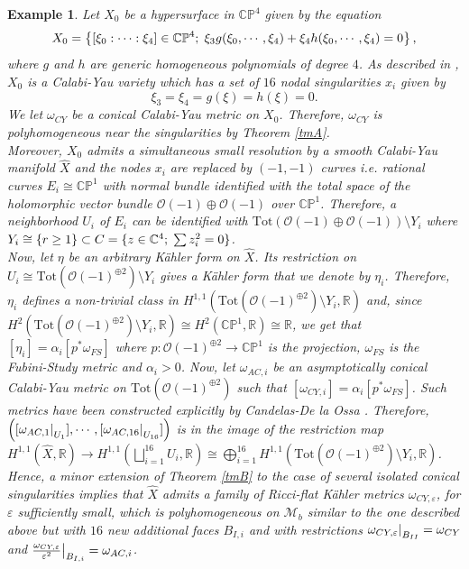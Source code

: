 \documentclass[a4paper,11pt]{article}
\newcounter{mythm}[section]
\newtheorem{ex}[mythm]{Example}
\def\C{\mathbb{C}}
\def\R{\mathbb{R}}
\newcommand\restr[2]{{%
  \left.\kern-\nulldelimiterspace %
  #1 %
  \littletaller %
  \right|_{#2} %
  }}
\newcommand{\littletaller}{\mathchoice{\vphantom{\big|}}{}{}{}}
\begin{document}
\begin{ex}
    Let $X_0$ be a hypersurface in $\mathbb{CP}^4$ given by the equation 
    $$
    X_0 = \left\{[\xi_0 : \cdots : \xi_4] \in \mathbb{CP}^4; \hspace{0.1cm} \xi_3 g(\xi_0, \cdots, \xi_4) + \xi_4h(\xi_0, \cdots, \xi_4) =0 \right\},
    $$
    where $g$ and $h$ are generic homogeneous polynomials of degree $4$. As described in \cite[Section 1, Section 2]{Rossi}, $X_0$ is a Calabi-Yau variety which has a set of $16$ nodal singularities $x_i$ given by 
    $$
    \xi_3 =\xi_4= g(\xi)=h(\xi)=0.
    $$
    We let $\omega_{CY}$ be a conical Calabi-Yau metric on $X_0$. Therefore, $\omega_{CY}$ is polyhomogeneous near the singularities by Theorem \ref{tmA}.\\
    
    Moreover, $X_0$ admits a simultaneous small resolution by a smooth Calabi-Yau manifold $\hat X$ and the nodes $x_i$  are replaced by $(-1,-1)$ curves i.e. rational curves $E_i \cong \mathbb{CP}^1$ with normal bundle identified with the total space of the holomorphic vector bundle $\mathcal{O}(-1) \oplus \mathcal{O}(-1)$ over $\mathbb{CP}^1$. Therefore, a neighborhood $U_i$ of $E_i$ can be identified with $\mathrm{Tot}(\mathcal{O}(-1) \oplus \mathcal{O}(-1)) \setminus Y_i$ where $Y_i \cong \{r \geq 1  \} \subset C = \{z \in \C^4; \hspace{0.1cm} \sum z_i^2=0 \}$.\\
    
    Now, let $\eta$ be an arbitrary Kähler form on $\hat X$. Its restriction on $U_i \cong \mathrm{Tot}(\mathcal{O}(-1)^{\oplus 2}) \setminus Y_i$ gives a  Kähler form that we denote by $\eta_i$.
    Therefore, $\eta_i$ defines a non-trivial class in $H^{1,1}\left(\mathrm{Tot}(\mathcal{O}(-1)^{\oplus 2}) \setminus Y_i, \R \right)$ and, since $H^2\left(\mathrm{Tot}(\mathcal{O}(-1)^{\oplus 2}) \setminus Y_i, \R \right) \cong H^2(\mathbb{CP}^1, \R) \cong \R$, we get that $[\eta_i] = \alpha_i [p^{*} \omega_{FS}]$ where $p : \mathcal{O}(-1)^{\oplus 2} \rightarrow \mathbb{CP}^1$ is the projection, $\omega_{FS}$ is the Fubini-Study metric and $\alpha_i >0$. Now,  let $\omega_{AC,i}$ be an asymptotically conical Calabi-Yau metric on $\mathrm{Tot}(\mathcal{O}(-1)^{\oplus 2})$ such that $[\omega_{CY,i}] = \alpha_i [p^* \omega_{FS}]$. Such metrics have been constructed explicitly by Candelas-De la Ossa \cite{candelas_comments_1990}. Therefore, $\left([\restr{\omega_{AC,1}}{U_1}], \cdots, [\restr{\omega_{AC,16}}{U_{16}}] \right)$ is in the image of the restriction map $H^{1,1}(\hat X, \R) \rightarrow H^{1,1}\left(\bigsqcup_{i=1}^{16} U_i, \R \right) \cong \bigoplus_{i=1}^{16} H^{1,1}(\mathrm{Tot}(\mathcal{O}(-1)^{\oplus 2}) \setminus Y_i, \R)$. Hence, a minor extension of Theorem \ref{tmB} to the case of several isolated conical singularities implies that $\hat X$ admits a family of Ricci-flat Kähler metrics $\omega_{CY,\varepsilon}$, for $\varepsilon$ sufficiently small, which is polyhomogeneous on $\mathcal{M}_b$ similar to the one described above but with $16$ new additional faces $B_{I,i}$ and with restrictions $\restr{\omega_{CY, \varepsilon}}{B_{II}} = \omega_{CY}$ and $\restr{\frac{\omega_{CY, \varepsilon}}{\varepsilon^2}}{B_{I,i}} = \omega_{AC,i}$.
\end{ex}
\end{document}

